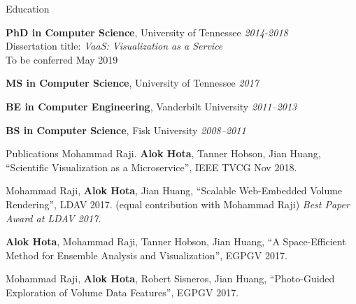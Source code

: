 \documentclass{resume} %
\begin{document}

\begin{rSection}{Education}

{{\bf PhD in Computer Science}, University of Tennessee} \hfill {\em 2014-2018} \\ 
Dissertation title: \emph{VaaS: Visualization as a Service}\\
To be conferred May 2019

{{\bf MS in Computer Science}, University of Tennessee} \hfill {\em 2017}

{{\bf BE in Computer Engineering}, Vanderbilt University} \hfill {\em 2011--2013}

{{\bf BS in Computer Science}, Fisk University} \hfill {\em 2008--2011}

\end{rSection}


\begin{rSection}{Publications}
    Mohammad Raji. \textbf{Alok Hota}, Tanner Hobson, Jian Huang, ``Scientific Visualization as a Microservice'', IEEE TVCG Nov 2018. \href{https://doi.org/10.1109/TVCG.2018.2879672}{\faLink}

    Mohammad Raji, \textbf{Alok Hota}, Jian Huang, ``Scalable Web-Embedded Volume Rendering'', LDAV 2017. (equal contribution with Mohammad Raji)
    \textit{Best Paper Award at LDAV 2017.} \href{http://web.eecs.utk.edu/~ahota/pdfs/tapestry-ldav-2017.pdf}{\faFilePdfO}
    
    \textbf{Alok Hota}, Mohammad Raji, Tanner Hobson, Jian Huang, ``A Space-Efficient Method for Ensemble Analysis and Visualization'', EGPGV 2017. \href{http://web.eecs.utk.edu/~ahota/pdfs/nea-egpgv-2017.pdf}{\faFilePdfO}
    
    Mohammad Raji, \textbf{Alok Hota}, Robert Sisneros, Jian Huang, ``Photo-Guided Exploration of Volume Data Features'', EGPGV 2017. \href{http://web.eecs.utk.edu/~ahota/pdfs/photoguided-egpgv-2017.pdf}{\faFilePdfO}
\end{rSection}

\end{document}
